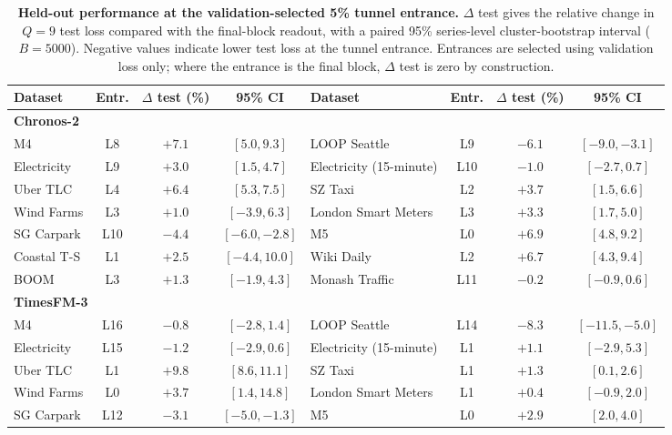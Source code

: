 \documentclass{article} %
\begin{document}
\begin{table}[p]
  \centering
  \caption{\textbf{Held-out performance at the validation-selected 5\% tunnel entrance.} $\Delta$ test gives the relative change in $Q=9$ test loss compared with the final-block readout, with a paired 95\% series-level cluster-bootstrap interval ($B=5000$). Negative values indicate lower test loss at the tunnel entrance. Entrances are selected using validation loss only; where the entrance is the final block, $\Delta$ test is zero by construction.}
  \vspace{4pt}
  \label{tab:heldout_q9}
  \scriptsize
  \setlength{\tabcolsep}{8pt}
  \begin{tabular}{@{}lccc@{\qquad}lccc@{}}
  \toprule
  Dataset & Entr. & $\Delta$ test (\%) & 95\% CI &
  Dataset & Entr. & $\Delta$ test (\%) & 95\% CI \\
  \midrule
  \multicolumn{8}{l}{\textbf{Chronos-2}} \\
  M4 & L8 & $+7.1$ & $[5.0, 9.3]$ &
  LOOP Seattle & L9 & $-6.1$ & $[-9.0, -3.1]$ \\
  Electricity & L9 & $+3.0$ & $[1.5, 4.7]$ &
  Electricity (15-minute) & L10 & $-1.0$ & $[-2.7, 0.7]$ \\
  Uber TLC & L4 & $+6.4$ & $[5.3, 7.5]$ &
  SZ Taxi & L2 & $+3.7$ & $[1.5, 6.6]$ \\
  Wind Farms & L3 & $+1.0$ & $[-3.9, 6.3]$ &
  London Smart Meters & L3 & $+3.3$ & $[1.7, 5.0]$ \\
  SG Carpark & L10 & $-4.4$ & $[-6.0, -2.8]$ &
  M5 & L0 & $+6.9$ & $[4.8, 9.2]$ \\
  Coastal T-S & L1 & $+2.5$ & $[-4.4, 10.0]$ &
  Wiki Daily & L2 & $+6.7$ & $[4.3, 9.4]$ \\
  BOOM & L3 & $+1.3$ & $[-1.9, 4.3]$ &
  Monash Traffic & L11 & $-0.2$ & $[-0.9, 0.6]$ \\
  \midrule
  \multicolumn{8}{l}{\textbf{TimesFM-3}} \\
  M4 & L16 & $-0.8$ & $[-2.8, 1.4]$ &
  LOOP Seattle & L14 & $-8.3$ & $[-11.5, -5.0]$ \\
  Electricity & L15 & $-1.2$ & $[-2.9, 0.6]$ &
  Electricity (15-minute) & L1 & $+1.1$ & $[-2.9, 5.3]$ \\
  Uber TLC & L1 & $+9.8$ & $[8.6, 11.1]$ &
  SZ Taxi & L1 & $+1.3$ & $[0.1, 2.6]$ \\
  Wind Farms & L0 & $+3.7$ & $[1.4, 14.8]$ &
  London Smart Meters & L1 & $+0.4$ & $[-0.9, 2.0]$ \\
  SG Carpark & L12 & $-3.1$ & $[-5.0, -1.3]$ &
  M5 & L0 & $+2.9$ & $[2.0, 4.0]$ \\

\end{tabular}
\end{table}
\end{document}
